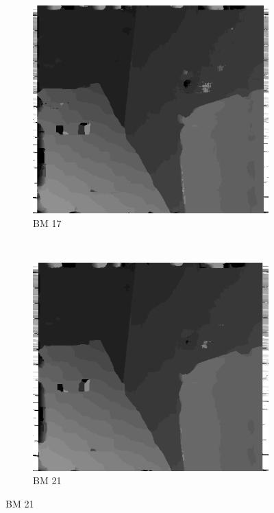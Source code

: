 \begin{figure}
\begin{subfigure}[b]{0.23\textwidth}
  \end{subfigure}
  ~
  \begin{subfigure}[b]{0.23\textwidth}
    \centering
    \includegraphics[width=\textwidth]{images/stereo-pairs/venus_bm_17.png}
    \caption{BM 17}
  \end{subfigure}
  ~
  \begin{subfigure}[b]{0.23\textwidth}
    \centering
    \includegraphics[width=\textwidth]{images/stereo-pairs/venus_bm_21.png}
    \caption{BM 21}
  \end{subfigure}


\end{figure}
